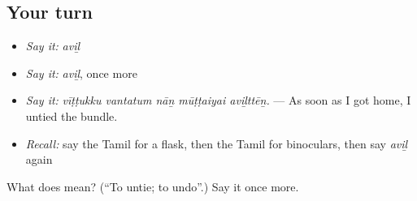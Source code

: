 \subsection*{Your turn}
\begin{itemize}
\raggedright
  \item \emph{Say it:} \emph{aviḻ}
  \item \emph{Say it:} \emph{aviḻ}, once more
  \item \emph{Say it:} \emph{vīṭṭukku vantatum nāṉ mūṭṭaiyai aviḻttēṉ.} — As soon as I got home, I untied the bundle.
  \item \emph{Recall:} say the Tamil for a flask, then the Tamil for binoculars, then say \emph{aviḻ} again
\end{itemize}

\begin{tcolorbox}[breakable,colback=teal!4,colframe=teal!35!black,title={Before you move on}]
What does  mean? (\textquotedblleft{}To untie; to undo\textquotedblright{}.) Say it once more.
\end{tcolorbox}
